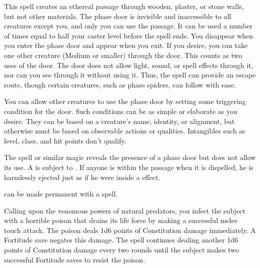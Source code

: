 \begin{spelleffect}
  This spell creates an ethereal passage through wooden, plaster, or stone walls, but not other materials. The phase door is invisible and inaccessible to all creatures except you, and only you can use the passage. It can be used a number of times equal to half your caster level before the spell ends. You disappear when you enter the phase door and appear when you exit. If you desire, you can take one other creature (Medium or smaller) through the door. This counts as two uses of the door. The door does not allow light, sound, or spell effects through it, nor can you see through it without using it. Thus, the spell can provide an escape route, though certain creatures, such as phase spiders, can follow with ease.
  \par You can allow other creatures to use the phase door by setting some triggering condition for the door. Such conditions can be as simple or elaborate as you desire. They can be based on a creature's name, identity, or alignment, but otherwise must be based on observable actions or qualities. Intangibles such as level, class, and hit points don't qualify.
\end{spelleffect}
\begin{spellnotes}
  The  spell or similar magic reveals the presence of a phase door but does not allow its use. A  is subject to . If anyone is within the passage when it is dispelled, he is harmlessly ejected just as if he were inside a  effect.
  \par {} can be made permanent with a  spell.
\end{spellnotes}

\begin{spelleffect}
  Calling upon the venomous powers of natural predators, you infect the subject with a horrible poison that drains its life force by making a successful melee touch attack. The poison deals 1d6 points of Constitution damage immediately. A Fortitude save negates this damage. The spell continues dealing another 1d6 points of Constitution damage every two rounds until the subject makes two successful Fortitude saves to resist the poison.
\end{spelleffect}

